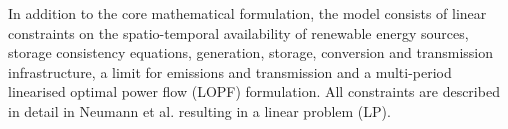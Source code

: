 In addition to the core mathematical formulation, the model consists of linear constraints on the spatio-temporal availability of renewable energy sources, storage consistency equations, generation, storage, conversion and transmission infrastructure, a limit for \co emissions and transmission and a multi-period linearised optimal power flow (LOPF) formulation. All constraints are described in detail in Neumann et al.\cite{Neumann2023} resulting in a linear problem (LP).

\clearpage